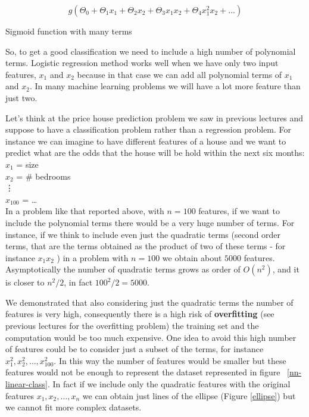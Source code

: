 \begin{eqfloat}[H]
\begin{equation}
	g(\Theta_0 + \Theta_1x_1 +  \Theta_2x_2 + \Theta_3x_1x_2 +  \Theta_4x_1^2x_2 + \dots )
\end{equation}
      \addtocounter{equation}{-1}
        \caption{ Sigmoid function with many terms}
        \label{eq:sigmoidmanyterms}
    \end{eqfloat}


So, to get a good classification we need to include a high number of polynomial terms. Logistic regression method works well when we have only two input features, $x_1$ and $x_2$ because in that case we can add all polynomial terms of $x_1$ and $x_2$. In many machine learning problems we will have a lot more feature than just two.

Let's think at the price house prediction problem we saw in previous lectures and suppose to have a classification problem rather than a regression problem. For instance we can imagine to have different features of a house and we want to predict what are the odds that the house will be hold within the next six months:
\\ 
$x_1$ = size \\
$x_2$ = \# bedrooms \\
\vdots \\
$x_{100}$ = \dots \\

In a problem like that reported above, with $n=100$ features, if we want to include the polynomial terms there would be a very huge number of terms. For instance, if we think to include even just the quadratic terms (second order terms, that are the terms obtained as the product of two of these terms - for instance $x_1x_2$ ) in a problem with $n=100$ we obtain about $5000$ features.\\
Asymptotically the number of quadratic terms grows as order of $O(n^2)$, and it is closer to $n^2/2$, in fact $100^2/2 = 5000$.

We demonstrated that also considering just the quadratic terms the number of features is very high, consequently there is a high risk of {\bf overfitting} (see previous lectures for the overfitting problem) the training set and the computation would be too much expensive.
One idea to avoid this high number of features could be to consider just a subset of the terms, for instance $x_1^2, x_2^2, \hdots , x_{100}^2$. In this way the number of features would be smaller but these features would not be enough to represent the dataset represented in figure ~\ref{nn-linear-class}.
In fact if we include only the quadratic features with the original features $x_1, x_2, \hdots, x_n$ we can obtain just lines of the ellipse (Figure \ref{ellipse}) but we cannot fit more complex datasets.

